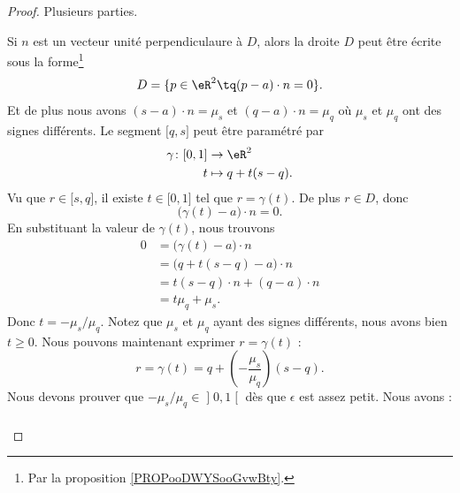 \begin{proof}
	Plusieurs parties.
	\begin{subproof}
		Si \( n\) est un vecteur unité perpendiculaure à \( D\), alors la droite \( D\) peut être écrite sous la forme\footnote{Par la proposition \ref{PROPooDWYSooGvwBty}.}
		\begin{equation}
			D=\{ p\in \eR^2\tq (p-a)\cdot n=0 \}.
		\end{equation}
		Et de plus nous avons \( (s-a)\cdot n=\mu_s\) et \( (q-a)\cdot n=\mu_q\) où \( \mu_s\) et \( \mu_q\) ont des signes différents. Le segment \( \mathopen[ q,s\mathclose]\) peut être paramétré par
		\begin{equation}
			\begin{aligned}
				\gamma\colon \mathopen[ 0, 1 \mathclose] & \to \eR^2         \\
				t                                        & \mapsto q+t(s-q).
			\end{aligned}
		\end{equation}
		Vu que \( r\in \mathopen[ s,q\mathclose]\), il existe \( t\in \mathopen[ 0,1\mathclose]\) tel que \( r=\gamma(t)\). De plus \( r\in D\), donc
		\begin{equation}
			\big( \gamma(t)-a \big)\cdot n=0.
		\end{equation}
		En substituant la valeur de \( \gamma(t)\), nous trouvons
		\begin{subequations}
			\begin{align}
				0 & =\big( \gamma(t)-a \big)\cdot n \\
				  & =\big( q+t(s-q)-a \big)\cdot n  \\
				  & =t(s-q)\cdot n+(q-a)\cdot n     \\
				  & =t\mu_q+\mu_s.
			\end{align}
		\end{subequations}
		Donc \( t=-\mu_s/\mu_q\). Notez que \( \mu_s\) et \( \mu_q\) ayant des signes différents, nous avons bien \( t\geq 0\). Nous pouvons maintenant exprimer \( r=\gamma(t)\) :
		\begin{equation}
			r=\gamma(t)=q+\left( -\frac{ \mu_s }{ \mu_q } \right)(s-q).
		\end{equation}
		Nous devons prouver que \( -\mu_s/\mu_q\in\mathopen] 0,1\mathclose[\) dès que \( \epsilon\) est assez petit. Nous avons :
			\begin{subequations}
				\begin{align}

\end{align}
\end{subequations}
\end{subproof}
\end{proof}
